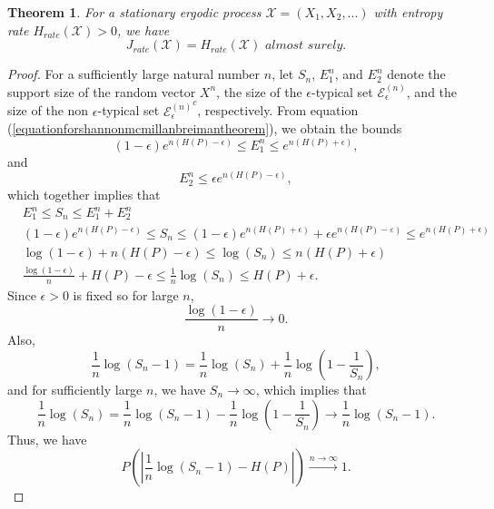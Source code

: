 \documentclass[pdflatex]{sn-jnl}%
\theoremstyle{thmstyleone}
\newtheorem{theorem}{Theorem}
\theoremstyle{thmstyletwo}%
\theoremstyle{thmstylethree}%
\begin{document}
\begin{theorem}
    For a stationary ergodic process $\mathcal{X}=(X_1, X_2,...)$ with entropy rate \( H_{rate}(\mathcal{X}) > 0 \), we have
\[
J_{rate}(\mathcal{X}) =  H_{rate}(\mathcal{X}) \textit{ \ almost surely}.
\]
\end{theorem}
\begin{proof}
    For a sufficiently large natural number \( n \), let \( S_n \), \( E_1^n \), and \( E_2^n \) denote the support size of the random vector \( X^n \), the size of the \( \epsilon \)-typical set \( \mathcal{E}_{\epsilon}^{(n)} \), and the size of the non \( \epsilon \)-typical set \( {\mathcal{E}_{\epsilon}^{(n)}}^c \), respectively. From equation (\ref{equationforshannonmcmillanbreimantheorem}), we obtain the bounds 
    \begin{equation*}
        (1-\epsilon)e^{n\left(H(P)-\epsilon \right)}\le E_1^n \le e^{n\left(H(P)+\epsilon \right)},
    \end{equation*}
    and 
    \begin{equation*}
        E_2^n\le \epsilon e^{n\left(H(P)-\epsilon \right)},
    \end{equation*}
    which together implies that
    \begin{equation}
        \begin{split}
            &E_1^n\le S_n \le E_1^n+E_2^n\\
            &(1-\epsilon)e^{n\left(H(P)-\epsilon \right)} \le S_n \le (1-\epsilon)e^{n\left(H(P)+\epsilon \right)}+ \epsilon e^{n\left(H(P)-\varepsilon \right)}\le e^{n\left(H(P)+\epsilon \right)} \\
            & \log(1-\epsilon)+n(H(P)-\epsilon) \le \log(S_n) \le n\left(H(P)+\epsilon \right) \\
            &\frac{\log(1-\epsilon)}{n}+H(P)-\epsilon \le \frac{1}{n} \log(S_n) \le H(P)+\epsilon.
        \end{split}
    \end{equation}
    Since $\epsilon>0$ is fixed so for large $n$, 
    \begin{equation*}
        \frac{\log(1-\epsilon)}{n}\to 0.
    \end{equation*}
    Also, 
    \begin{equation}
        \frac{1}{n}\log(S_n-1)=\frac{1}{n}\log(S_n)+\frac{1}{n}\log\left(1-\frac{1}{S_n}\right),
    \end{equation}
    and for sufficiently large $n$, we have $S_n\to \infty$, which implies that  
    \begin{equation}
    \frac{1}{n}\log(S_n)=\frac{1}{n}\log(S_n-1)-\frac{1}{n}\log\left(1-\frac{1}{S_n}\right) \to \frac{1}{n}\log(S_n-1).
    \end{equation}
    Thus, we have 
    \begin{equation}
       P\left( \left| \frac{1}{n}\log(S_n-1)- H(P) \right|\right) \xrightarrow[]{n \to \infty}1.
    \end{equation}
\end{proof}
\end{document}
